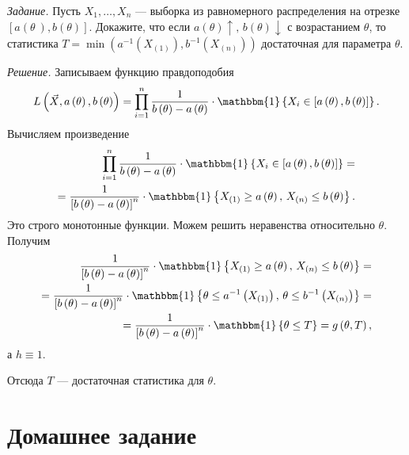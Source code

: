 \textit{Задание.}
Пусть $X_1, \dotsc, X_n$ ---
выборка из равномерного распределения на отрезке
$ \left[ a \left( \theta\ \right), b \left( \theta \right) \right] $.
Докажите,
что если $a \left( \theta \right) \uparrow, \, b \left( \theta \right) \downarrow $ с возрастанием
$ \theta $,
то статистика
$T =
  \min \left(
    a^{-1} \left( X_{ \left( 1 \right) } \right), b^{-1} \left( X_{ \left( n \right) } \right)
  \right) $
достаточная для параметра $ \theta $.

\textit{Решение.} Записываем функцию правдоподобия
$$L \left( \vec{X}, a \left( \theta \right), b \left( \theta \right) \right) =
  \prod \limits_{i = 1}^n
    \frac{1}{b \left( \theta \right) - a \left( \theta \right) } \cdot
    \mathbbm{1} \left\{
      X_i \in \left[ a \left( \theta \right), b \left( \theta \right) \right]
    \right\}.$$
Вычисляем произведение
\begin{equation*}
  \begin{split}
    \prod \limits_{i = 1}^n
      \frac{1}{b \left( \theta \right) - a \left( \theta \right) } \cdot
      \mathbbm{1} \left\{
        X_i \in \left[ a \left( \theta \right), b \left( \theta \right) \right]
      \right\} = \\
    = \frac{1}{ \left[ b \left( \theta \right) - a \left( \theta \right) \right]^n} \cdot
    \mathbbm{1} \left\{
      X_{ \left( 1 \right) } \geq a \left( \theta \right), \,
      X_{ \left( n \right) } \leq b \left( \theta \right)
    \right\}.
  \end{split}
\end{equation*}
Это строго монотонные функции.
Можем решить неравенства относительно $ \theta $.
Получим
\begin{equation*}
  \begin{split}
    \frac{1}{ \left[ b \left( \theta \right) - a \left( \theta \right) \right]^n} \cdot
    \mathbbm{1} \left\{
      X_{ \left( 1 \right) } \geq a \left( \theta \right), \,
      X_{ \left( n \right) } \leq b \left( \theta \right)
    \right\} = \\
    = \frac{1}{ \left[ b \left( \theta \right) - a \left( \theta \right) \right]^n} \cdot
    \mathbbm{1} \left\{
      \theta \leq a^{-1} \left( X_{ \left( 1 \right) } \right), \,
      \theta \leq b^{-1} \left( X_{ \left( n \right) } \right)
    \right\} = \\
    = \frac{1}{ \left[ b \left( \theta \right) - a \left( \theta \right) \right]^n} \cdot
    \mathbbm{1} \left\{ \theta \leq T \right\} =
    g \left( \theta, T \right),
  \end{split}
\end{equation*}
а $h \equiv 1$.

Отсюда $T$ --- достаточная статистика для $ \theta $.

\section*{Домашнее задание}
